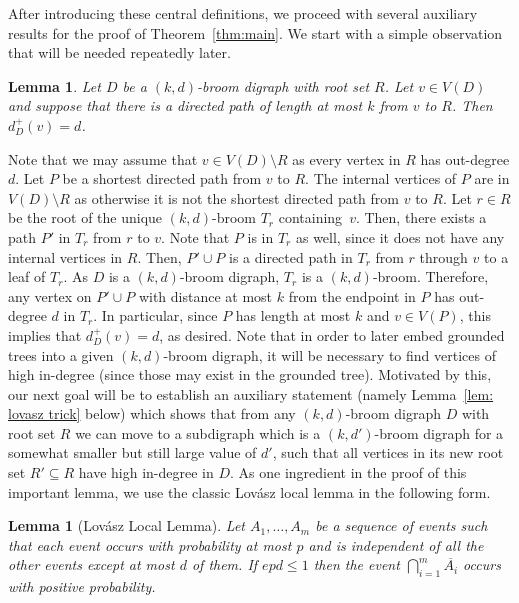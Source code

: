 \documentclass[a4paper,11pt]{article}
\makeatletter
\renewenvironment{proof}[1][\proofname] {\par\pushQED{\qed}\normalfont\topsep6\p@\@plus6\p@\relax\trivlist\item[\hskip\labelsep\bfseries#1\@addpunct{.}]\ignorespaces}{\popQED\endtrivlist\@endpefalse}
\newtheorem{lemma}[theorem]{\bf Lemma}
\theoremstyle{definition}
\makeatother
\begin{document}
After introducing these central definitions, we proceed with several auxiliary results for the proof of Theorem~\ref{thm:main}. We start with a simple observation that will be needed repeatedly later.
\begin{lemma}\label{lem: high degree}
    Let $D$ be a $(k,d)$-broom digraph with root set $R$. Let $v\in V(D)$ and suppose that there is a directed path of length at most $k$ from $v$ to $R$. Then $d_D^+(v)= d$.
\end{lemma}
\begin{proof}
    Note that we may assume that $v\in V(D)\setminus R$ as every vertex in $R$ has out-degree $d$. Let $P$ be a shortest directed path from $v$ to $R$. The internal vertices of $P$ are in $V(D)\setminus R$ as otherwise it is not the shortest directed path from $v$ to $R$. Let $r\in R$ be the root of the unique $(k,d)$-broom $T_r$ containing~$v$. Then, there exists a path $P'$ in $T_r$ from $r$ to $v$. Note that $P$ is in $T_r$ as well, since it does not have any internal vertices in $R$. Then, $P'\cup P$ is a directed path in $T_r$ from $r$ through $v$ to a leaf of $T_r$. 
    As $D$ is a $(k,d)$-broom digraph, $T_r$ is a $(k,d)$-broom. Therefore, any vertex on $P'\cup P$ with distance at most $k$ from the endpoint in $P$ has out-degree $d$ in $T_r$. 
    In particular, since $P$ has length at most $k$ and $v\in V(P)$, this implies that $d_D^+(v)=d$, as desired.
\end{proof}
Note that in order to later embed grounded trees into a given $(k,d)$-broom digraph, it will be necessary to find vertices of high in-degree (since those may exist in the grounded tree). Motivated by this,  our next goal will be to establish an auxiliary statement (namely Lemma~\ref{lem: lovasz trick} below) which shows that from any $(k,d)$-broom digraph $D$ with root set $R$ we can move to a subdigraph which is a $(k,d')$-broom digraph for a somewhat smaller but still large value of $d'$, such that all vertices in its new root set $R'\subseteq R$ have high in-degree in $D$. As one ingredient in the proof of this important lemma, we use the classic Lov\'{a}sz local lemma in the following form.
\begin{lemma}[Lov\'{a}sz Local Lemma]\label{lem: lovasz local lemma}
    Let $A_1,\ldots,A_m$ be a sequence of events such that each event occurs with probability at most $p$ and is independent of all the other events except at most $d$ of them. If $epd\leq 1$ then the event $\bigcap_{i=1}^{m}\overline{A_i}$ occurs with positive probability.
\end{lemma}
\end{document}
